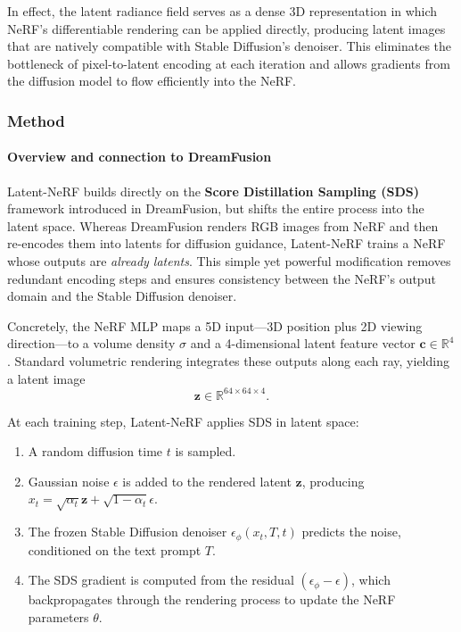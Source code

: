 \begin{enrichment}
\begin{enrichment}
        In effect, the latent radiance field serves as a dense 3D representation in which NeRF’s differentiable rendering can be applied directly, producing latent images that are natively compatible with Stable Diffusion’s denoiser. This eliminates the bottleneck of pixel-to-latent encoding at each iteration and allows gradients from the diffusion model to flow efficiently into the NeRF.
        
        \newpage
        
        \subsubsection{Method}
        \label{subsec:chapter23_latentnerf_method}
        
        \paragraph{Overview and connection to DreamFusion}
        Latent-NeRF builds directly on the \textbf{Score Distillation Sampling (SDS)} framework introduced in DreamFusion, but shifts the entire process into the latent space. Whereas DreamFusion renders RGB images from NeRF and then re-encodes them into latents for diffusion guidance, Latent-NeRF trains a NeRF whose outputs are \emph{already latents}. This simple yet powerful modification removes redundant encoding steps and ensures consistency between the NeRF’s output domain and the Stable Diffusion denoiser.
        
        Concretely, the NeRF MLP maps a 5D input---3D position plus 2D viewing direction---to a volume density $\sigma$ and a 4-dimensional latent feature vector $\mathbf{c}\in\mathbb{R}^4$. Standard volumetric rendering integrates these outputs along each ray, yielding a latent image 
        \[
        \mathbf{z} \in \mathbb{R}^{64\times 64\times 4}.
        \]
        
        At each training step, Latent-NeRF applies SDS in latent space:
        \begin{enumerate}
            \item A random diffusion time $t$ is sampled.
            \item Gaussian noise $\epsilon$ is added to the rendered latent $\mathbf{z}$, producing $x_t = \sqrt{\alpha_t}\mathbf{z} + \sqrt{1-\alpha_t}\epsilon$.
            \item The frozen Stable Diffusion denoiser $\epsilon_\phi(x_t, T, t)$ predicts the noise, conditioned on the text prompt $T$.
            \item The SDS gradient is computed from the residual $(\epsilon_\phi - \epsilon)$, which backpropagates through the rendering process to update the NeRF parameters $\theta$.
        \end{enumerate}
        

\end{enrichment}
\end{enrichment}
